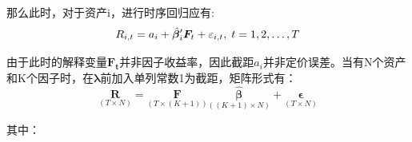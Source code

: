 \documentclass[11pt]{article}
\begin{document}
那么此时，对于资产i，进行时序回归应有:
\begin{equation*}
    R_{i,t} = a_i + \hat{\bm{\beta}}_{i}' \bm{F}_t + \varepsilon_{i,t} ,\; t=1,2,\dots,T
\end{equation*}

由于此时的解释变量$\bm{F_t}$并非因子收益率，因此截距$a_i$并非定价误差。当有N个资产和K个因子时，在$\bm{\lambda}$前加入单列常数1为截距，矩阵形式有：
\begin{equation*}
    \underset{\scriptscriptstyle{(T \times N)}}{\bm{R}}
    = \underset{\scriptscriptstyle{\left(T \times (K+1)\right)}}{\bm{F}}
    \underset{\scriptscriptstyle{\left((K+1) \times N\right)}}{\hat{\bm{\beta}}} 
    + \underset{\scriptscriptstyle{(T \times N)}}{\bm{\epsilon}}
\end{equation*}

其中：
\end{document}
